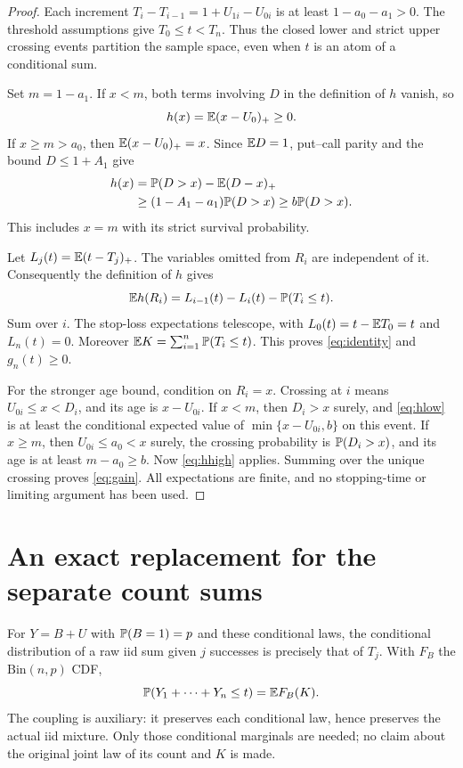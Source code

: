 \documentclass[11pt]{article}
\begin{document}
\begin{proof}
Each increment $T_i-T_{i-1}=1+U_{1i}-U_{0i}$ is at least
$1-a_0-a_1>0$. The threshold assumptions give $T_0\le t<T_n$.
Thus the closed lower and strict upper crossing events partition the
sample space, even when $t$ is an atom of a conditional sum.

Set $m=1-a_1$. If $x<m$, both terms involving $D$ in the definition
of $h$ vanish, so
\begin{equation}\label{eq:hlow}
                         h(x)=\mathbb E(x-U_0)_+\ge0.
\end{equation}
If $x\ge m>a_0$, then $\mathbb E(x-U_0)_+=x$. Since $\mathbb E D=1$,
put--call parity and the bound $D\le1+A_1$ give
\begin{align}\label{eq:hhigh}
 h(x)&=\mathbb P(D>x)-\mathbb E(D-x)_+\notag\\
     &\ge(1-A_1-a_1)\mathbb P(D>x)\ge b\mathbb P(D>x).
\end{align}
This includes $x=m$ with its strict survival probability.

Let $L_j(t)=\mathbb E(t-T_j)_+$. The variables omitted from $R_i$ are
independent of it. Consequently the definition of $h$ gives
\begin{equation}\label{eq:telescoping}
 \mathbb E h(R_i)=L_{i-1}(t)-L_i(t)-\mathbb P(T_i\le t).
\end{equation}
Sum over $i$. The stop-loss expectations telescope, with
$L_0(t)=t-\mathbb E T_0=t$ and $L_n(t)=0$. Moreover
$\mathbb E K=\sum_{i=1}^n\mathbb P(T_i\le t)$. This proves
\eqref{eq:identity} and $g_n(t)\ge0$.

For the stronger age bound, condition on $R_i=x$. Crossing at $i$
means $U_{0i}\le x<D_i$, and its age is $x-U_{0i}$.
If $x<m$, then $D_i>x$ surely, and \eqref{eq:hlow} is at least the conditional
expected value of $\min\{x-U_{0i},b\}$ on this event.
If $x\ge m$, then $U_{0i}\le a_0<x$ surely, the crossing probability
is $\mathbb P(D_i>x)$, and its age is at least $m-a_0\ge b$.
Now \eqref{eq:hhigh} applies. Summing over the unique crossing proves
\eqref{eq:gain}. All expectations are finite, and no stopping-time or
limiting argument has been used.
\end{proof}

\section*{An exact replacement for the separate count sums}
For $Y=B+U$ with $\mathbb P(B=1)=p$ and these conditional laws, the conditional
distribution of a raw iid sum given $j$ successes is precisely that of
$T_j$. With $F_B$ the $\mathrm{Bin}(n,p)$ CDF,
\begin{equation}\label{eq:cdf}
            \mathbb P(Y_1+\cdots+Y_n\le t)=\mathbb E F_B(K).
\end{equation}
The coupling is auxiliary: it preserves each conditional law, hence
preserves the actual iid mixture. Only those conditional marginals are
needed; no claim about the original joint law of its count and $K$ is made.
\end{document}
